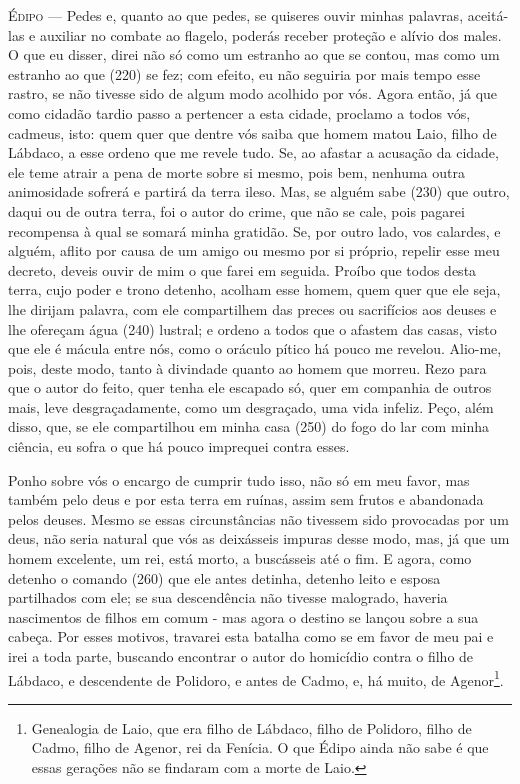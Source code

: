 \textsc{Édipo} --- Pedes e, quanto ao que pedes, se quiseres ouvir minhas palavras,
aceitá-las e auxiliar no combate ao flagelo, poderás receber proteção e
alívio dos males. O que eu disser, direi não só como um estranho ao que
se contou, mas como um estranho ao que (220) se fez; com efeito, eu não
seguiria por mais tempo esse rastro, se não tivesse sido de algum modo
acolhido por vós. Agora então, já que como cidadão tardio passo a
pertencer a esta cidade, proclamo a todos vós, cadmeus, isto: quem quer
que dentre vós saiba que homem matou Laio, filho de Lábdaco, a esse
ordeno que me revele tudo. Se, ao afastar a acusação da cidade, ele teme
atrair a pena de morte sobre si mesmo, pois bem, nenhuma outra
animosidade sofrerá e partirá da terra ileso. Mas, se alguém sabe (230)
que outro, daqui ou de outra terra, foi o autor do crime, que não se
cale, pois pagarei recompensa à qual se somará minha gratidão. Se, por
outro lado, vos calardes, e alguém, aflito por causa de um amigo ou
mesmo por si próprio, repelir esse meu decreto, deveis ouvir de mim o
que farei em seguida. Proíbo que todos desta terra, cujo poder e trono
detenho, acolham esse homem, quem quer que ele seja, lhe dirijam
palavra, com ele compartilhem das preces ou sacrifícios aos deuses e lhe
ofereçam água (240) lustral; e ordeno a todos que o afastem das casas,
visto que ele é mácula entre nós, como o oráculo pítico há pouco me
revelou. Alio-me, pois, deste modo, tanto à divindade quanto ao homem
que morreu. Rezo para que o autor do feito, quer tenha ele escapado só,
quer em companhia de outros mais, leve desgraçadamente, como um
desgraçado, uma vida infeliz. Peço, além disso, que, se ele compartilhou
em minha casa (250) do fogo do lar com minha ciência, eu sofra o que há
pouco imprequei contra esses.

Ponho sobre vós o encargo de cumprir tudo isso, não só em meu favor, mas
também pelo deus e por esta terra em ruínas, assim sem frutos e
abandonada pelos deuses. Mesmo se essas circunstâncias não tivessem sido
provocadas por um deus, não seria natural que vós as deixásseis impuras
desse modo, mas, já que um homem excelente, um rei, está morto, a
buscásseis até o fim. E agora, como detenho o comando (260) que ele
antes detinha, detenho leito e esposa partilhados com ele; se sua
descendência não tivesse malogrado, haveria nascimentos de filhos em
comum - mas agora o destino se lançou sobre a sua cabeça. Por esses
motivos, travarei esta batalha como se em favor de meu pai e irei a toda
parte, buscando encontrar o autor do homicídio contra o filho de
Lábdaco, e descendente de Polidoro, e antes de Cadmo, e, há muito, de
Agenor\footnote{Genealogia de Laio, que era filho de Lábdaco, filho de
  Polidoro, filho de Cadmo, filho de Agenor, rei da Fenícia. O que Édipo
  ainda não sabe é que essas gerações não se findaram com a morte de
  Laio.}.

